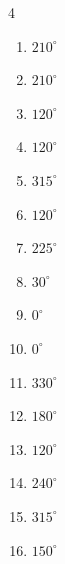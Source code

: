 \begin{multicols}{4}
\begin{enumerate}
  \item $\displaystyle 210^{\circ}$

  \item $\displaystyle 210^{\circ}$

  \item $\displaystyle 120^{\circ}$

  \item $\displaystyle 120^{\circ}$

  \item $\displaystyle 315^{\circ}$

  \item $\displaystyle 120^{\circ}$

  \item $\displaystyle 225^{\circ}$

  \item $\displaystyle 30^{\circ}$

  \item $\displaystyle 0^{\circ}$
        \phantom{$\displaystyle =0$}

\columnbreak %

\resetques

  \item $\displaystyle 0^{\circ}$
        \phantom{$\displaystyle =0$}

  \item $\displaystyle 330^{\circ}$

  \item $\displaystyle 180^{\circ}$
        \phantom{$\displaystyle =\pi$}

  \item $\displaystyle 120^{\circ}$

  \item $\displaystyle 240^{\circ}$

  \item $\displaystyle 315^{\circ}$

  \item $\displaystyle 150^{\circ}$


\end{enumerate}
\end{multicols}
